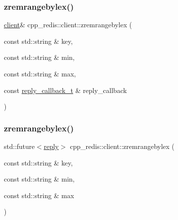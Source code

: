 \mbox{\label{classcpp__redis_1_1client_a8fe114da4df2dfd2ab5240554444a294}} 
\subsubsection{\texorpdfstring{zremrangebylex()}{zremrangebylex()}\hspace{0.1cm}{\footnotesize\ttfamily [5/6]}}
{\footnotesize\ttfamily \hyperlink{classcpp__redis_1_1client}{client}\& cpp\+\_\+redis\+::client\+::zremrangebylex (\begin{DoxyParamCaption}\item[{const std\+::string \&}]{key,  }\item[{const std\+::string \&}]{min,  }\item[{const std\+::string \&}]{max,  }\item[{const \hyperlink{classcpp__redis_1_1client_a061a1140d36d2eaeda82b09a0bb3f9f2}{reply\+\_\+callback\+\_\+t} \&}]{reply\+\_\+callback }\end{DoxyParamCaption})}

\mbox{\label{classcpp__redis_1_1client_a1350d0df45d5b41c940d782682b41bd9}} 
\subsubsection{\texorpdfstring{zremrangebylex()}{zremrangebylex()}\hspace{0.1cm}{\footnotesize\ttfamily [6/6]}}
{\footnotesize\ttfamily std\+::future$<$\hyperlink{classcpp__redis_1_1reply}{reply}$>$ cpp\+\_\+redis\+::client\+::zremrangebylex (\begin{DoxyParamCaption}\item[{const std\+::string \&}]{key,  }\item[{const std\+::string \&}]{min,  }\item[{const std\+::string \&}]{max }\end{DoxyParamCaption})}

\mbox{\label{classcpp__redis_1_1client_af40c1e6895312c13636db9dd610ce753}} 

